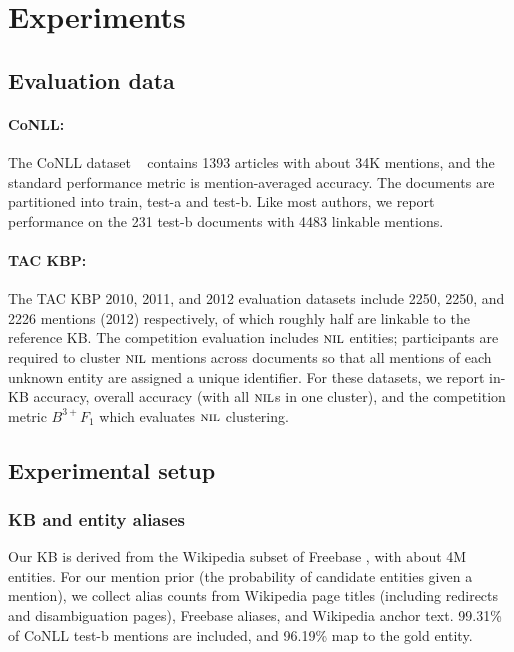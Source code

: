 \section{Experiments}
\label{sec:expt}

\subsection{Evaluation data}

\paragraph*{CoNLL:} 
The CoNLL dataset ~\cite{Hoffart2011} contains 1393 articles with
about 34K mentions, and the standard performance metric is
mention-averaged accuracy.  The documents are partitioned into train,
test-a and test-b. Like most authors, we report performance on the
231 test-b documents with 4483 linkable mentions.  


\paragraph*{TAC KBP:} 
The TAC KBP 2010, 2011, and 2012 evaluation datasets \cite{TAC2010,TAC2011,TAC2012} include 2250,
2250, and 2226 mentions (2012) respectively,
of which roughly half are linkable
to the reference KB.  The competition evaluation includes $\mbox{\textsc{nil}}$
entities; participants are required to cluster $\mbox{\textsc{nil}}$ mentions across
documents so that all mentions of each unknown entity are assigned a
unique identifier.  For these datasets, we report in-KB accuracy,
overall accuracy (with all $\mbox{\textsc{nil}}$s in one cluster), and the competition
metric $B^{3+} F_1$ which evaluates $\mbox{\textsc{nil}}$ clustering. 

\subsection{Experimental setup}

\subsubsection{KB and entity aliases}

Our KB is derived from the Wikipedia subset of Freebase
\cite{BollackerEPST08}, with about 4M entities. For
our mention prior (the probability of candidate entities given a mention), we
collect alias counts from 
Wikipedia page titles (including redirects and disambiguation
pages), Freebase aliases, and Wikipedia anchor text.
99.31\% of CoNLL test-b mentions are included, and 96.19\% map to the gold entity.

